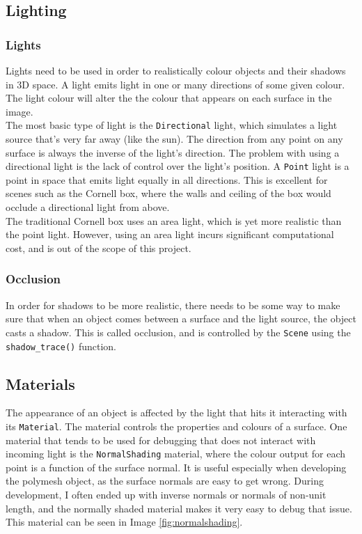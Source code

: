 \documentclass[a4paper]{article}
\begin{document}
\subsection{Lighting}
\subsubsection{Lights}
Lights need to be used in order to realistically colour objects and their shadows in 3D space. A light emits light in one or many directions of some given colour. The light colour will alter the the colour that appears on each surface in the image.\\

The most basic type of light is the \texttt{Directional} light, which simulates a light source that's very far away (like the sun). The direction from any point on any surface is always the inverse of the light's direction. The problem with using a directional light is the lack of control over the light's position. A \texttt{Point} light is a point in space that emits light equally in all directions. This is excellent for scenes such as the Cornell box, where the walls and ceiling of the box would occlude a directional light from above.\\

The traditional Cornell box uses an area light, which is yet more realistic than the point light. However, using an area light incurs significant computational cost, and is out of the scope of this project.\\

\subsubsection{Occlusion}
In order for shadows to be more realistic, there needs to be some way to make sure that when an object comes between a surface and the light source, the object casts a shadow. This is called occlusion, and is controlled by the \texttt{Scene} using the \texttt{shadow\_trace()} function.\\

\subsection{Materials}
The appearance of an object is affected by the light that hits it interacting with its \texttt{Material}. The material controls the properties and colours of a surface. One material that tends to be used for debugging that does not interact with incoming light is the \texttt{NormalShading} material, where the colour output for each point is a function of the surface normal. It is useful especially when developing the polymesh object, as the surface normals are easy to get wrong. During development, I often ended up with inverse normals or normals of non-unit length, and the normally shaded material makes it very easy to debug that issue. This material can be seen in Image \ref{fig:normalshading}.\\
\end{document}
